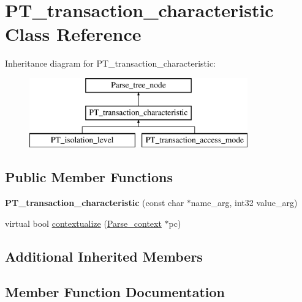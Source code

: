 \hypertarget{classPT__transaction__characteristic}{}\section{P\+T\+\_\+transaction\+\_\+characteristic Class Reference}
\label{classPT__transaction__characteristic}
Inheritance diagram for P\+T\+\_\+transaction\+\_\+characteristic\+:\begin{figure}[H]
\begin{center}
\leavevmode
\includegraphics[height=3.000000cm]{classPT__transaction__characteristic}
\end{center}
\end{figure}
\subsection*{Public Member Functions}
\begin{DoxyCompactItemize}
\item 
\mbox{\label{classPT__transaction__characteristic_abde76ce961077aecd7a9a75361fa1589}} 
{\bfseries P\+T\+\_\+transaction\+\_\+characteristic} (const char $\ast$name\+\_\+arg, int32 value\+\_\+arg)
\item 
virtual bool \mbox{\hyperlink{classPT__transaction__characteristic_afea326fbb1ad30e10a057b10f7a9ef6c}{contextualize}} (\mbox{\hyperlink{structParse__context}{Parse\+\_\+context}} $\ast$pc)
\end{DoxyCompactItemize}
\subsection*{Additional Inherited Members}


\subsection{Member Function Documentation}
\mbox{\label{classPT__transaction__characteristic_afea326fbb1ad30e10a057b10f7a9ef6c}} 
